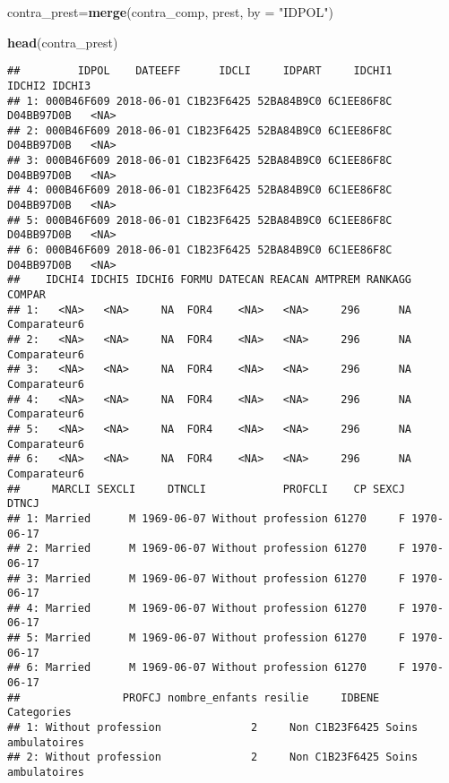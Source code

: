 \documentclass[
]{article}
\newenvironment{Shaded}{\begin{snugshade}}{\end{snugshade}}
\newcommand{\DataTypeTok}[1]{\textcolor[rgb]{0.13,0.29,0.53}{#1}}
\newcommand{\KeywordTok}[1]{\textcolor[rgb]{0.13,0.29,0.53}{\textbf{#1}}}
\newcommand{\NormalTok}[1]{#1}
\newcommand{\StringTok}[1]{\textcolor[rgb]{0.31,0.60,0.02}{#1}}
\begin{document}
\begin{Shaded}
\begin{Highlighting}[]
\NormalTok{contra_prest=}\KeywordTok{merge}\NormalTok{(contra_comp, prest, }\DataTypeTok{by =} \StringTok{"IDPOL"}\NormalTok{)}
\end{Highlighting}
\end{Shaded}

\begin{Shaded}
\begin{Highlighting}[]
\KeywordTok{head}\NormalTok{(contra_prest)}
\end{Highlighting}
\end{Shaded}

\begin{verbatim}
##         IDPOL    DATEEFF      IDCLI     IDPART     IDCHI1     IDCHI2 IDCHI3
## 1: 000B46F609 2018-06-01 C1B23F6425 52BA84B9C0 6C1EE86F8C D04BB97D0B   <NA>
## 2: 000B46F609 2018-06-01 C1B23F6425 52BA84B9C0 6C1EE86F8C D04BB97D0B   <NA>
## 3: 000B46F609 2018-06-01 C1B23F6425 52BA84B9C0 6C1EE86F8C D04BB97D0B   <NA>
## 4: 000B46F609 2018-06-01 C1B23F6425 52BA84B9C0 6C1EE86F8C D04BB97D0B   <NA>
## 5: 000B46F609 2018-06-01 C1B23F6425 52BA84B9C0 6C1EE86F8C D04BB97D0B   <NA>
## 6: 000B46F609 2018-06-01 C1B23F6425 52BA84B9C0 6C1EE86F8C D04BB97D0B   <NA>
##    IDCHI4 IDCHI5 IDCHI6 FORMU DATECAN REACAN AMTPREM RANKAGG       COMPAR
## 1:   <NA>   <NA>     NA  FOR4    <NA>   <NA>     296      NA Comparateur6
## 2:   <NA>   <NA>     NA  FOR4    <NA>   <NA>     296      NA Comparateur6
## 3:   <NA>   <NA>     NA  FOR4    <NA>   <NA>     296      NA Comparateur6
## 4:   <NA>   <NA>     NA  FOR4    <NA>   <NA>     296      NA Comparateur6
## 5:   <NA>   <NA>     NA  FOR4    <NA>   <NA>     296      NA Comparateur6
## 6:   <NA>   <NA>     NA  FOR4    <NA>   <NA>     296      NA Comparateur6
##     MARCLI SEXCLI     DTNCLI            PROFCLI    CP SEXCJ      DTNCJ
## 1: Married      M 1969-06-07 Without profession 61270     F 1970-06-17
## 2: Married      M 1969-06-07 Without profession 61270     F 1970-06-17
## 3: Married      M 1969-06-07 Without profession 61270     F 1970-06-17
## 4: Married      M 1969-06-07 Without profession 61270     F 1970-06-17
## 5: Married      M 1969-06-07 Without profession 61270     F 1970-06-17
## 6: Married      M 1969-06-07 Without profession 61270     F 1970-06-17
##                PROFCJ nombre_enfants resilie     IDBENE         Categories
## 1: Without profession              2     Non C1B23F6425 Soins ambulatoires
## 2: Without profession              2     Non C1B23F6425 Soins ambulatoires

\end{verbatim}
\end{document}
